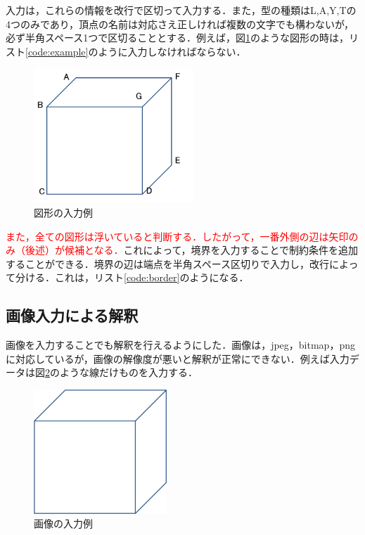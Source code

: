 \documentclass{jarticle}
\begin{document}
入力は，これらの情報を改行で区切って入力する．また，型の種類はL,A,Y,Tの4つのみであり，頂点の名前は対応さえ正しければ複数の文字でも構わないが，必ず半角スペース1つで区切ることとする．例えば，図\ref{fig:example}のような図形の時は，リスト\ref{code:example}のように入力しなければならない．
\begin{figure}[H]
\begin{center}
\includegraphics[width=60mm]{image/example.png}
\caption{図形の入力例}
\label{fig:example}
\end{center}
\end{figure}

\lstset{style=customplain}


\textcolor{red}{また，全ての図形は浮いていると判断する．したがって，一番外側の辺は矢印のみ（後述）が候補となる．}これによって，境界を入力することで制約条件を追加することができる．境界の辺は端点を半角スペース区切りで入力し，改行によって分ける．これは，リスト\ref{code:border}のようになる．

\lstset{style=customplain}






\subsection{画像入力による解釈}
画像を入力することでも解釈を行えるようにした．画像は，jpeg，bitmap，pngに対応しているが，画像の解像度が悪いと解釈が正常にできない．例えば入力データは図\ref{fig:example_image}のような線だけものを入力する．

\begin{figure}[H]
\begin{center}
\includegraphics[width=50mm]{image/example_image.png}
\caption{画像の入力例}
\label{fig:example_image}
\end{center}
\end{figure}
\end{document}
